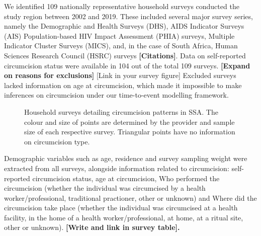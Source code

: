 \documentclass{article}
\begin{document}
\begin{appendix}
We identified 109 nationally representative household surveys conducted the study region  between 2002 and 2019. 
These included several major survey series, namely the Demographic and Health Surveys (DHS), AIDS Indicator Surveys (AIS) Population-based HIV Impact Assessment (PHIA) surveys, Multiple Indicator Cluster Surveys (MICS), and, in the case of South Africa, Human Sciences Research Council (HSRC) surveys \textbf{[Citations]}. 
Data on self-reported circumcision status were available in 104 out of the total 109 surveys. 
\textbf{[Expand on reasons for exclusions]} [Link in your survey figure] Excluded surveys lacked information on age at circumcision, which made it impossible to make inferences on circumcision under our time-to-event modelling framework.  

\begin{figure}[H]
    \centering
    \caption{Household surveys detailing circumcision patterns in SSA. The colour and size of points are determined by the provider and sample size of each respective survey. Triangular points have no information on circumcision type.}
    \label{fig:enter-label}
\end{figure}

Demographic variables such as age, residence and survey sampling weight were extracted from all surveys, alongside information related to circumcision: self-reported circumcision status, age at circumcision, Who performed the circumcision (whether the individual was circumcised by a health worker/professional, traditional practioner, other or unknown)  and Where did the circumcision take place (whether the individual was circumcised at a health facility, in the home of a health worker/professional, at home, at a ritual site, other or unknown). \textbf{[Write and link in survey table].}


\end{appendix}
\end{document}
